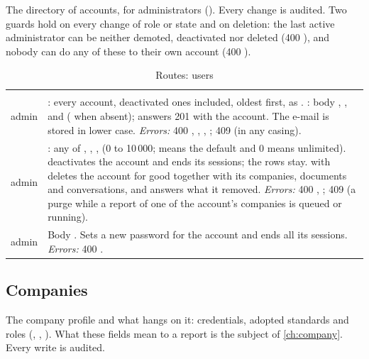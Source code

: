 The directory of accounts, for administrators (). Every change
is audited. Two guards hold on every change of role or state and on deletion: the last active administrator can be neither
demoted, deactivated nor deleted (400 ), and nobody can do any of these to
their own account (400 ).

\begin{xltabular}{\textwidth}{@{}L{19mm}Y@{}}
\caption{Routes: users}\label{tab:api:users}\\
\toprule {} &  \\ \midrule \endfirsthead
\toprule {} &  \\ \midrule \endhead
\bottomrule \endlastfoot
{}
admin & : every account, deactivated ones included, oldest first, as .
  : body , ,  and 
  ( when absent); answers 201 with the account. The e-mail is stored in lower case.
  \emph{Errors:} 400 , , ,
  ; 409  (in any casing). \\
\addlinespace
{}
admin & : any of , , ,
   (0 to 10\,000;  means the default and 0 means unlimited).
   deactivates the account and ends its sessions; the rows stay. 
  with  deletes the account for good together with its companies, documents
  and conversations, and answers what it removed. \emph{Errors:} 400 ,
  ; 409  (a purge while a report of one of the
  account's companies is queued or running). \\
\addlinespace
{}
admin & Body . Sets a new password for the account and ends all its
  sessions. \emph{Errors:} 400 . \\
\end{xltabular}

\subsection{Companies}\label{sec:api:companies}

The company profile and what hangs on it: credentials, adopted standards and roles
(, ,
). What
these fields mean to a report is the subject of \cref{ch:company}. Every write is audited.

